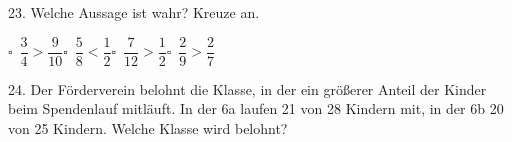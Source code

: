 \documentclass[11pt]{article}
\begin{document}
\begin{pfaufg}{}{23.}{}
Welche Aussage ist wahr? Kreuze an.\par\medskip\noindent\hspace*{7mm}\mbox{$\square$\ $\dfrac{3}{4} > \dfrac{9}{10}$}\hspace{10mm}\mbox{$\square$\ $\dfrac{5}{8} < \dfrac{1}{2}$}\hspace{10mm}\mbox{$\square$\ $\dfrac{7}{12} > \dfrac{1}{2}$}\hspace{10mm}\mbox{$\square$\ $\dfrac{2}{9} > \dfrac{2}{7}$}\rule[-3mm]{0pt}{8mm}\par\smallskip 
{}
\end{pfaufg}

\begin{pfaufg}{}{24.}{}
Der Förderverein belohnt die Klasse, in der ein größerer Anteil der Kinder beim Spendenlauf mitläuft. In der 6a laufen 21 von 28 Kindern mit, in der 6b 20 von 25 Kindern. Welche Klasse wird belohnt?
\end{pfaufg}

\par\vfill{}
\end{document}
